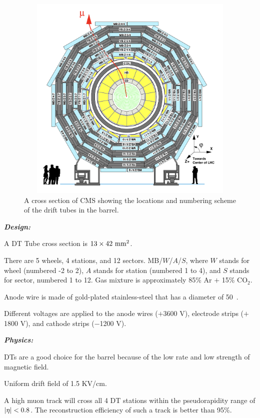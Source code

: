 \begin{figure}[pbth]
    \centering
    \includegraphics[width=15cm,height=10cm,keepaspectratio]{figures/cms/muonsys/drifttube_locations.jpeg}
    \caption{
        A cross section of CMS showing the locations and numbering scheme of the drift tubes in the barrel.
        }
        \label{fig:dt_locations}
\end{figure}

\textbf{\textit{Design:}}

A DT 
Tube cross section is $13 \times 42~\text{mm}^{2}$.

There are 5 wheels, 4 stations, and 12 sectors.
MB/$W$/$A$/$S$,
where $W$ stands for wheel (numbered -2 to 2),
$A$ stands for station (numbered 1 to 4),
and $S$ stands for sector, numbered 1 to 12.
Gas mixture is approximately 85\% Ar $+$ 15\% CO$_{2}$.

Anode wire is made of gold-plated stainless-steel that has a diameter of 50~\mum.

Different voltages are applied to the anode wires ($+$3600 V), electrode strips ($+$1800 V), and cathode strips ($-$1200 V).

\textbf{\textit{Physics:}}

DTs are a good choice for the barrel because of the low rate and low strength of magnetic field.

Uniform drift field of 1.5 KV/cm.

A high \pt muon track will cross all 4 DT stations within the pseudorapidity range of $\left|\eta\right| < 0.8$.
The reconstruction efficiency of such a track is better than 95\%.

